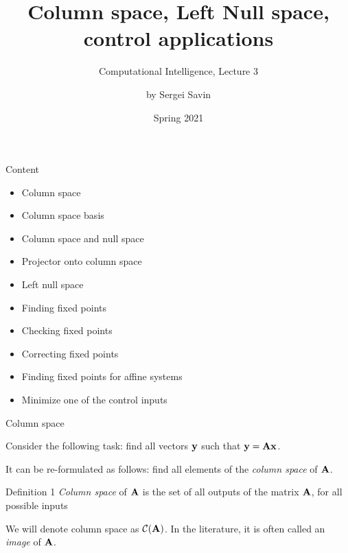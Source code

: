 \documentclass{beamer}
\title{Column space, Left Null space, control applications}
\subtitle{Computational Intelligence, Lecture 3}
\author{by Sergei Savin}
\date{Spring 2021}
\begin{document}
\maketitle


\begin{frame}{Content}

\begin{itemize}
\item Column space
\item Column space basis
\item Column space and null space
\item Projector onto column space
\item Left null space
\item Finding fixed points
\item Checking fixed points
\item Correcting fixed points
\item Finding fixed points for affine systems
\item Minimize one of the control inputs
\end{itemize}

\end{frame}





\begin{frame}{Column space}
\begin{flushleft}

Consider the following task: find all vectors $\mathbf{y}$ such that $\mathbf{y} = \mathbf{A} \mathbf{x}$.

\bigskip

It can be re-formulated as follows: find all elements of the \emph{column space} of $\mathbf{A}$.

\begin{block}{Definition 1}
  \emph{Column space} of $\mathbf{A}$ is the set of all outputs of the matrix $\mathbf{A}$, for all possible inputs
\end{block}

\bigskip

We will denote column space as $\mathcal{C}(\mathbf{A})$. In the literature, it is often called an \emph{image} of $\mathbf{A}$.

\end{flushleft}
\end{frame}
\end{document}
